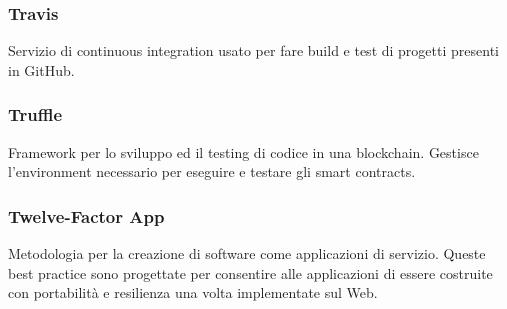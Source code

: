 \subsubsection*{Travis}
Servizio di continuous integration usato per fare build e test di progetti presenti in GitHub.

\subsubsection*{Truffle}
Framework per lo sviluppo ed il testing di codice in una blockchain\glo. Gestisce l'environment necessario per eseguire e testare gli smart contracts\glo.

\subsubsection*{Twelve-Factor App}
Metodologia per la creazione di software come applicazioni di servizio. Queste best practice sono progettate per consentire alle applicazioni di essere costruite con portabilità e resilienza una volta implementate sul Web.

